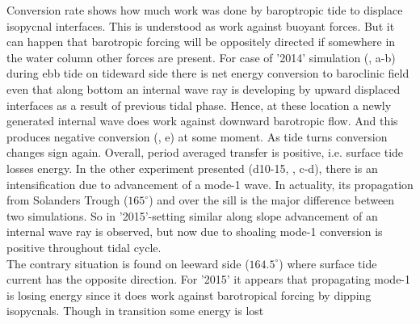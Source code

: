 \documentclass[12pt]{article}
\begin{document}
Conversion rate shows how much work was done by baroptropic tide to displace isopycnal interfaces. 
This is understood as work against buoyant forces. But it can happen that barotropic forcing will 
be oppositely directed if somewhere in the water column other forces are present. For case of 
'2014' 
simulation (, a-b) during ebb tide on tideward side there is net energy 
conversion to baroclinic field even that along bottom an internal wave ray is developing by upward 
displaced interfaces as a result of previous tidal phase. Hence, at these location a newly 
generated internal wave does work against downward barotropic flow. And this produces negative 
conversion (, e) at some moment. As tide turns conversion changes sign 
again. Overall, period averaged transfer is positive, i.e. surface tide losses energy. In 
the other experiment presented (d10-15, , c-d), there is an intensification 
due 
to advancement of a mode-1 wave. In actuality, its propagation from Solanders Trough 
($165^{\circ}$) 
and over the sill is the major difference between two simulations. So in '2015'-setting similar 
along slope advancement of an internal wave ray is observed, but now due to shoaling mode-1 
conversion is positive throughout tidal cycle.\\
The contrary situation is found on leeward side ($164.5^{\circ}$) where surface tide current has the
opposite direction. For '2015' it appears that propagating mode-1 is losing energy since it does 
work against barotropical forcing by dipping isopycnals. Though in transition some energy is lost 
\end{document}
